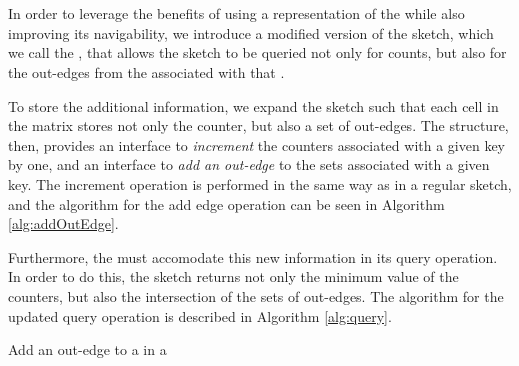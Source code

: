 \section{\dBCM}
\label{sec:debruijncountmin}



In order to leverage the benefits of using a \cm representation of the \dBG while also improving its navigability, we introduce a modified
version of the \cm sketch, which we call the \dBCM, that allows the sketch to be queried not only for \kmer counts, but also for the
out-edges from the \dBG associated with that \kmer. 

To store the additional information, we expand the \cm sketch such that each cell in the matrix stores not only the counter,
but also a set of out-edges. The structure, then, provides an interface to \emph{increment} the counters associated with a given key by one,
and an interface to \emph{add an out-edge} to the sets associated with a given key. The increment operation is performed in the same way as in
a regular \cm sketch, and the algorithm for the add edge operation can be seen in Algorithm \ref{alg:addOutEdge}.

Furthermore, the \dBCM must accomodate this new information in its query operation. In order to do this, the sketch returns not only
the minimum value of the counters, but also the intersection of the sets of out-edges. The algorithm for the updated query operation is
described in Algorithm \ref{alg:query}.

\begin{algorithm}[htbp]
    \caption{Add an out-edge to a \kmer in a \dBCM}\label{alg:addOutEdge}
\end{algorithm}

